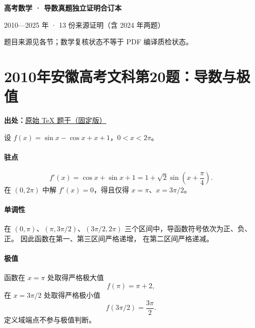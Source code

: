 \documentclass[UTF8,a4paper,11pt]{ctexart}
\begin{document}
\begin{center}
{\huge\bfseries 高考数学 · 导数真题独立证明合订本}\par\medskip
{\large 2010—2025 年 · 13 份来源证明（含 2024 年两题）}\par\bigskip
{\small 题目来源见各节；数学复核状态不等于 PDF 编译质检状态。}
\end{center}
\tableofcontents
\clearpage
\clearpage
{}
{}
\section*{2010年安徽高考文科第20题：导数与极值}
\noindent\textbf{出处：}\href{https://github.com/DxAThing/Gaokao-Math-Problems-Compilation/blob/f1ae169b58a75b3db6e35c670b3f0d5c78718188/content/2010/anhui_liberal.tex#L426}{原始 TeX 题干（固定版）}

设 $f(x)=\sin x-\cos x+x+1$，$0<x<2\pi$。

\paragraph{驻点}
\[
f'(x)=\cos x+\sin x+1
     =1+\sqrt{2}\sin\left(x+\frac{\pi}{4}\right).
\]
在 $(0,2\pi)$ 中解 $f'(x)=0$，得且仅得
$x=\pi$、$x=3\pi/2$。

\paragraph{单调性}
在 $(0,\pi)$、$(\pi,3\pi/2)$、$(3\pi/2,2\pi)$
三个区间中，导函数符号依次为正、负、正。
因此函数在第一、第三区间严格递增，
在第二区间严格递减。

\paragraph{极值}
函数在 $x=\pi$ 处取得严格极大值
\[
f(\pi)=\pi+2,
\]
在 $x=3\pi/2$ 处取得严格极小值
\[
f(3\pi/2)=\frac{3\pi}{2}.
\]
定义域端点不参与极值判断。
\end{document}
